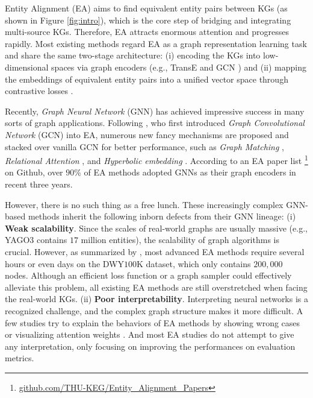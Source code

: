 \documentclass[11pt]{article}
\begin{document}
Entity Alignment (EA) aims to find equivalent entity pairs between KGs (as shown in Figure \ref{fig:intro}), which is the core step of bridging and integrating multi-source KGs.
Therefore, EA attracts enormous attention and progresses rapidly.
Most existing methods regard EA as a graph representation learning task and share the same two-stage architecture: (i) encoding the KGs into low-dimensional spaces via graph encoders (e.g., TransE \cite{DBLP:conf/nips/BordesUGWY13} and GCN \cite{DBLP:journals/corr/KipfW16}) and (ii) mapping the embeddings of equivalent entity pairs into a unified vector space through contrastive losses \cite{DBLP:conf/cvpr/HadsellCL06}.

Recently, \emph{Graph Neural Network} (GNN) has achieved impressive success in many sorts of graph applications.
Following \citet{DBLP:conf/emnlp/WangLLZ18}, who first introduced \emph{Graph Convolutional Network} (GCN) into EA, numerous new fancy mechanisms are proposed and stacked over vanilla GCN for better performance, such as \emph{Graph Matching} \cite{DBLP:conf/iclr/FeyL0MK20}, \emph{Relational Attention} \cite{DBLP:conf/wsdm/MaoWXLW20}, and \emph{Hyperbolic embedding} \cite{DBLP:conf/emnlp/SunCHWDZ20}.
According to an EA paper list \footnote{\url{github.com/THU-KEG/Entity_Alignment_Papers}} on Github, over $90\%$ of EA methods adopted GNNs as their graph encoders in recent three years.

However, there is no such thing as a free lunch.
These increasingly complex GNN-based methods inherit the following inborn defects from their GNN lineage:
(i) \textbf{Weak scalability}.
Since the scales of real-world graphs are usually massive (e.g., YAGO$3$ \cite{DBLP:conf/www/SuchanekKW07} contains $17$ million entities), the scalability of graph algorithms is crucial.
However, as summarized by \citet{9174835}, most advanced EA methods require several hours \cite{DBLP:conf/ijcai/SunHZQ18, DBLP:conf/acl/CaoLLLLC19} or even days \cite{DBLP:conf/acl/XuWYFSWY19} on the DWY$100$K dataset, which only contains $200,000$ nodes.
Although an efficient loss function \cite{DBLP:conf/www/MaoWWL21} or a graph sampler \cite{DBLP:journals/corr/abs-2205-10312} could effectively alleviate this problem, all existing EA methods are still overstretched when facing the real-world KGs.
(ii) \textbf{Poor interpretability}.
Interpreting neural networks is a recognized challenge, and the complex graph structure makes it more difficult.
A few studies try to explain the behaviors of EA methods by showing wrong cases \cite{DBLP:conf/emnlp/YangZSLLS19} or visualizing attention weights \cite{DBLP:conf/acl/WuLFWZ20}.
And most EA studies \cite{DBLP:conf/ijcai/SunHZQ18, DBLP:conf/acl/XuWYFSWY19, DBLP:conf/cikm/MaoWXWL20} do not attempt to give any interpretation, only focusing on improving the performances on evaluation metrics.
\end{document}
